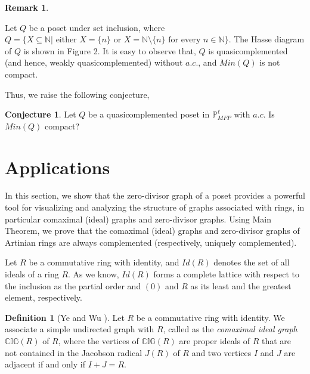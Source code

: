 \documentclass[10pt,one side,emlines]{amsart}
\theoremstyle{definition}
\newtheorem*{cthm*}{Conjecture}
\newtheorem{rem}[lem]{Remark}
\newtheorem{defn}[lem]{Definition}
\begin{document}
\begin{rem}
\begin{center}
\end{center}
\vspace{-.25in}
\label{figure2}
	
	Let $Q$ be a poset under set inclusion, where $Q=\{X\subseteq \mathbb{N}| \text{ either } X=\{n\} \text{ or } X=\mathbb{N}\setminus\{n\} \text{ for every } n \in \mathbb{N}\}$. The Hasse diagram of $Q$ is shown in Figure 2. It is easy to observe that, $Q$ is quasicomplemented (and hence, weakly quasicomplemented) without $a.c.$, and $Min(Q)$ is not compact.
\end{rem}
Thus, we raise the following conjecture,
\begin{cthm*} Let $Q$ be a quasicomplemented poset in $\mathbb{P}^{\ell}_{MFP}$ with  $a.c.$ Is $Min(Q)$ compact?
\end{cthm*}


\section{Applications}

In this section, we show that the zero-divisor graph of a poset provides a powerful tool for visualizing and analyzing the structure of graphs associated with rings, in particular comaximal (ideal) graphs and zero-divisor graphs. Using Main Theorem, we prove that the comaximal (ideal) graphs and zero-divisor graphs of Artinian rings are always complemented (respectively, uniquely complemented).

Let $R$ be a commutative ring with identity, and $Id(R)$ denotes the set of all ideals of a ring $R$. As we know, $Id(R)$ forms a complete lattice with respect to the inclusion as the partial order and $(0)$ and $R$ as its least and the greatest element, respectively.


\begin{defn}[Ye and Wu \cite{YW}]
	Let $R$ be a commutative ring with identity. We associate a simple undirected graph with $R$, called as the \textit{comaximal ideal graph} $\mathbb{CIG}(R)$ of $R$, where the vertices of $\mathbb{CIG}(R)$
	are proper ideals of $R$ that are not contained in the Jacobson radical $J(R)$ of $R$ and two vertices $I$ and	$J$ are adjacent if and only if $I + J = R$.
\end{defn}
\end{document}
